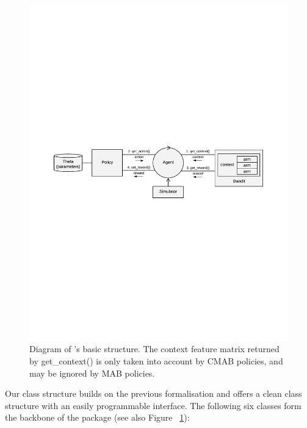 \documentclass{jss}
\begin{document}
\begin{figure}[H]
  \centering
    \includegraphics[width=.99\textwidth]{fig/CMAB_chart}

      \caption{Diagram of 's basic structure. The context feature matrix returned by get\_context() is only taken into account by CMAB policies, and may be ignored by MAB policies.}
      \label{fig:CMAB_chart}
\end{figure}

Our class structure builds on the previous formalisation and offers a clean class structure with an easily programmable interface. The following six classes form the backbone of the package (see also Figure ~\ref{fig:CMAB_chart}):
\end{document}
